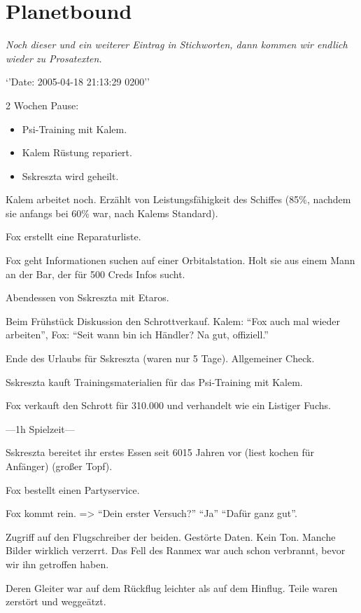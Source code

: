 \documentclass[11pt]{article}
\begin{document}
\section{Planetbound}

\emph{Noch dieser und ein weiterer Eintrag in Stichworten, dann kommen
wir endlich wieder zu Prosatexten.}

`'Date: 2005-04-18 21:13:29 0200''

2 Wochen Pause:

\begin{itemize}
\item
  Psi-Training mit Kalem.
\item
  Kalem Rüstung repariert.
\item
  Sskreszta wird geheilt.
\end{itemize}
Kalem arbeitet noch. Erzählt von Leistungsfähigkeit des Schiffes (85\%,
nachdem sie anfangs bei 60\% war, nach Kalems Standard).

Fox erstellt eine Reparaturliste.

Fox geht Informationen suchen auf einer Orbitalstation. Holt sie aus
einem Mann an der Bar, der für 500 Creds Infos sucht.

Abendessen von Sskreszta mit Etaros.

Beim Frühstück Diskussion den Schrottverkauf. Kalem: ``Fox auch mal
wieder arbeiten'', Fox: ``Seit wann bin ich Händler? Na gut,
offiziell.''

Ende des Urlaubs für Sskreszta (waren nur 5 Tage). Allgemeiner Check.

Sskreszta kauft Trainingsmaterialien für das Psi-Training mit Kalem.

Fox verkauft den Schrott für 310.000 und verhandelt wie ein Listiger
Fuchs.

---1h Spielzeit---

Sskreszta bereitet ihr erstes Essen seit 6015 Jahren vor (liest kochen
für Anfänger) (großer Topf).

Fox bestellt einen Partyservice.

Fox kommt rein. =\textgreater{} ``Dein erster Versuch?'' ``Ja'' ``Dafür
ganz gut''.

Zugriff auf den Flugschreiber der beiden. Gestörte Daten. Kein Ton.
Manche Bilder wirklich verzerrt. Das Fell des Ranmex war auch schon
verbrannt, bevor wir ihn getroffen haben.

Deren Gleiter war auf dem Rückflug leichter als auf dem Hinflug. Teile
waren zerstört und weggeätzt.
\end{document}
